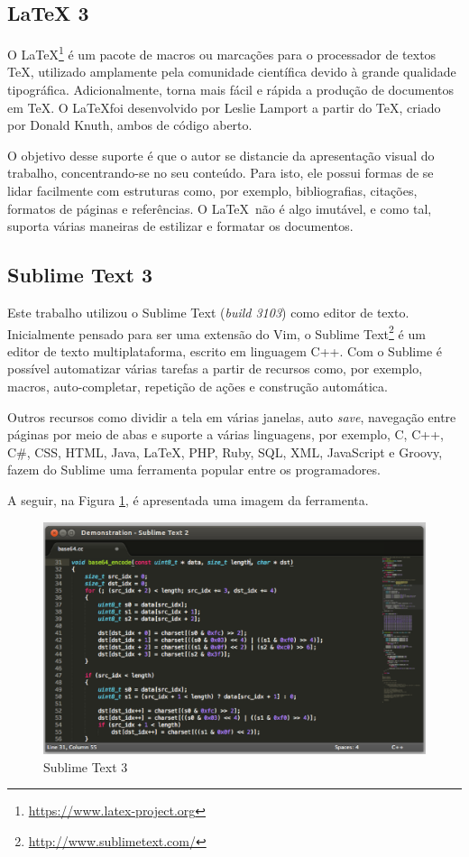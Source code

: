 \subsection{LaTeX 3}

O \LaTeX\footnote{\url{https://www.latex-project.org}} é um pacote de macros ou marcações para o processador de textos \TeX, utilizado amplamente pela comunidade científica devido à grande qualidade tipográfica. Adicionalmente, torna mais fácil e rápida a produção de documentos em \TeX. O \LaTeX foi desenvolvido por Leslie Lamport a partir do \TeX, criado por Donald Knuth, ambos de código aberto.

O objetivo desse suporte é que o autor se distancie da apresentação visual do trabalho, concentrando-se no seu conteúdo. Para isto, ele possui formas de se lidar facilmente com estruturas como, por exemplo, bibliografias, citações, formatos de páginas e referências. O \LaTeX\ não é algo imutável, e como tal, suporta várias maneiras de estilizar e formatar os documentos.

\subsection{Sublime Text 3}

Este trabalho utilizou o Sublime Text (\textit{build 3103}) como editor de texto. Inicialmente pensado para ser uma extensão do Vim, o Sublime Text\footnote{\url{http://www.sublimetext.com/}} é um editor de texto multiplataforma, escrito em linguagem C++. Com o Sublime é possível automatizar várias tarefas a partir de recursos como, por exemplo, macros, auto-completar, repetição de ações e construção automática.

Outros recursos como dividir a tela em várias janelas, auto \textit{save}, navegação entre páginas por meio de abas e suporte a várias linguagens, por exemplo, C, C++, C\#, CSS, HTML, Java, \LaTeX, PHP, Ruby, SQL, XML, JavaScript e Groovy, fazem do Sublime uma ferramenta popular entre os programadores.

A seguir, na Figura \ref{sublime}, é apresentada uma imagem da ferramenta.

\begin{figure}[!h]
	\centering
	\includegraphics[scale=0.35]{figuras/suporte_tecnologico/sublime.eps}
	\caption{Sublime Text 3}
	\label{sublime}
\end{figure}

